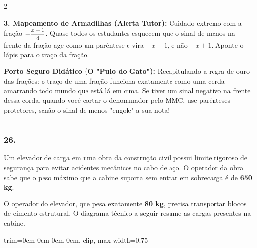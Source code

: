\begin{multicols*}{2}
\begin{tcolorbox}[colback=CorTitUm!5, colframe=CorTitUm, boxrule=1pt, arc=4pt, left=6pt, right=6pt, top=6pt, bottom=6pt]
    \textbf{3. Mapeamento de Armadilhas (Alerta Tutor):} Cuidado extremo com a fração $-\mfrac{x+1}{4}$. Quase todos os estudantes esquecem que o sinal de menos na frente da fração age como um parêntese e vira $-x - 1$, e não $-x + 1$. Aponte o lápis para o traço da fração.
    \end{tcolorbox}
    \vspace{0.15cm}
    
    \begin{boxexplicacao}
    \textbf{Porto Seguro Didático (O "Pulo do Gato"):} Recapitulando a regra de ouro das frações: o traço de uma fração funciona exatamente como uma corda amarrando todo mundo que está lá em cima. Se tiver um sinal negativo na frente dessa corda, quando você cortar o denominador pelo MMC, use parênteses protetores, senão o sinal de menos "engole" a sua nota!
    \end{boxexplicacao}
\fi

\par\vspace{\espacoQuestao}


\noindent\textcolor{CorLinha}{\rule{\linewidth}{0.5pt}} 
\par\vspace{\espacoPreQuestao}
\subsubsection*{26.} 
\begin{enunciadoLiteral}
Um elevador de carga em uma obra da construção civil possui limite rigoroso de segurança para evitar acidentes mecânicos no cabo de aço. O operador da obra sabe que o peso máximo que a cabine suporta sem entrar em sobrecarga é de \textbf{650 kg}.

O operador do elevador, que pesa exatamente \textbf{80 kg}, precisa transportar blocos de cimento estrutural. O diagrama técnico a seguir resume as cargas presentes na cabine.

\begin{center}
\begin{adjustbox}{trim=0cm 0cm 0cm 0cm, clip, max width=0.75\linewidth}
\end{adjustbox}
\end{center}
\end{enunciadoLiteral}
\end{multicols*}
